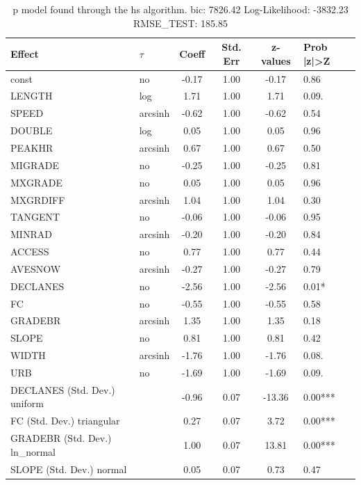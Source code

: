\begin{table}
	\caption{p model found through the hs algorithm. bic: 7826.42 Log-Likelihood: -3832.23 RMSE_TEST: 185.85}
	\begin{center}
		\begin{tabular}{|l|l|c|c|c|l|}
			\hline
			Effect & $\tau$ & Coeff & Std. Err & z-values & Prob |z|>Z \\
			\hline
			const & no & -0.17 & 1.00 & -0.17 & 0.86 \\
			\hline
			LENGTH & log & 1.71 & 1.00 & 1.71 & 0.09. \\
			\hline
			SPEED & arcsinh & -0.62 & 1.00 & -0.62 & 0.54 \\
			\hline
			DOUBLE & log & 0.05 & 1.00 & 0.05 & 0.96 \\
			\hline
			PEAKHR & arcsinh & 0.67 & 1.00 & 0.67 & 0.50 \\
			\hline
			MIGRADE & no & -0.25 & 1.00 & -0.25 & 0.81 \\
			\hline
			MXGRADE & no & 0.05 & 1.00 & 0.05 & 0.96 \\
			\hline
			MXGRDIFF & arcsinh & 1.04 & 1.00 & 1.04 & 0.30 \\
			\hline
			TANGENT & no & -0.06 & 1.00 & -0.06 & 0.95 \\
			\hline
			MINRAD & arcsinh & -0.20 & 1.00 & -0.20 & 0.84 \\
			\hline
			ACCESS & no & 0.77 & 1.00 & 0.77 & 0.44 \\
			\hline
			AVESNOW & arcsinh & -0.27 & 1.00 & -0.27 & 0.79 \\
			\hline
			DECLANES & no & -2.56 & 1.00 & -2.56 & 0.01* \\
			\hline
			FC & no & -0.55 & 1.00 & -0.55 & 0.58 \\
			\hline
			GRADEBR & arcsinh & 1.35 & 1.00 & 1.35 & 0.18 \\
			\hline
			SLOPE & no & 0.81 & 1.00 & 0.81 & 0.42 \\
			\hline
			WIDTH & arcsinh & -1.76 & 1.00 & -1.76 & 0.08. \\
			\hline
			URB & no & -1.69 & 1.00 & -1.69 & 0.09. \\
			\hline
			DECLANES (Std. Dev.) uniform &  & -0.96 & 0.07 & -13.36 & 0.00*** \\
			\hline
			FC (Std. Dev.) triangular &  & 0.27 & 0.07 & 3.72 & 0.00*** \\
			\hline
			GRADEBR (Std. Dev.) ln_normal &  & 1.00 & 0.07 & 13.81 & 0.00*** \\
			\hline
			SLOPE (Std. Dev.) normal &  & 0.05 & 0.07 & 0.73 & 0.47 \\

\end{tabular}
\end{center}
\end{table}
